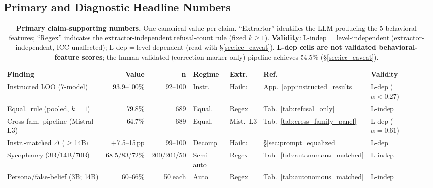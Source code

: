 \subsection{Primary and Diagnostic Headline Numbers}\label{app:headlines}

\begin{table}[h]
\centering
\caption{\textbf{Primary claim-supporting numbers.} One canonical value per claim. ``Extractor'' identifies the LLM producing the 5 behavioral features; ``Regex'' indicates the extractor-independent refusal-count rule (fixed $k\!\geq\!1$). \textbf{Validity}: L-indep = level-independent (extractor-independent, ICC-unaffected); L-dep = level-dependent (read with §\ref{sec:icc_caveat}). \textbf{L-dep cells are not validated behavioral-feature scores}; the human-validated (correction-marker only) pipeline achieves 54.5\% (§\ref{sec:icc_caveat}).}
\label{tab:headlines_primary}
\label{tab:headlines}
\begin{scriptsize}
\setlength{\tabcolsep}{3pt}
\begin{tabular}{lrrlllll}
\toprule
\textbf{Finding} & \textbf{Value} & \textbf{n} & \textbf{Regime} & \textbf{Extr.} & \textbf{Ref.} & \textbf{Validity} \\
\midrule
Instructed LOO (7-model) & 93.9--100\% & 92--100 & Instr. & Haiku & App.~\ref{app:instructed_results} & L-dep ($\alpha{<}0.27$) \\
Equal.\ rule (pooled, $k\!=\!1$) & 79.8\% & 689 & Equal. & Regex & Tab.~\ref{tab:refusal_only} & L-indep \\
Cross-fam.\ pipeline (Mistral L3) & 64.7\% & 689 & Equal. & Mist.\ L3 & Tab.~\ref{tab:cross_family_panel} & L-dep ($\alpha{=}0.61$) \\
Instr.-matched $\Delta$ ($\geq$14B) & $+$7.5--15\,pp & 99--100 & Decomp & Haiku & \S\ref{sec:prompt_equalized} & L-dep \\
Sycophancy (3B/14B/70B) & 68.5/83/72\% & 200/200/50 & Semi-auto & Regex & Tab.~\ref{tab:autonomous_matched} & L-indep \\
Persona/false-belief (3B; 14B) & 60--66\% & 50 each & Auto & Regex & Tab.~\ref{tab:autonomous_matched} & L-indep \\
\bottomrule
\end{tabular}
\end{scriptsize}
\end{table}


